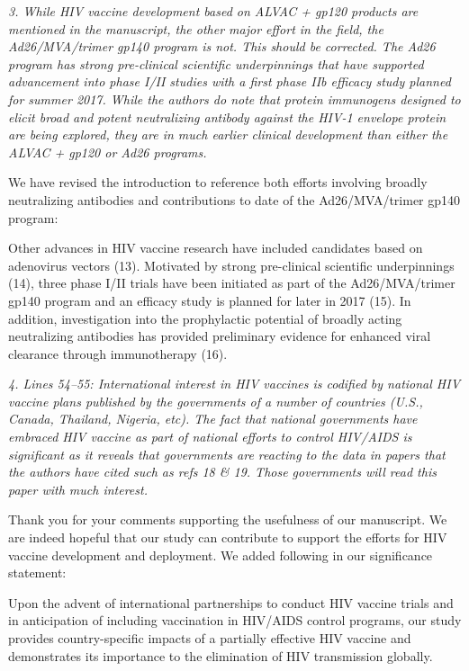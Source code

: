 \documentclass[12pt]{jpmletter}
\newenvironment{original}{\it}{}
\begin{document}
\begin{letter}{}
    \begin{original}
      3. While HIV vaccine development based on ALVAC + gp120 products
      are mentioned in the manuscript, the other major effort in the
      field, the Ad26/MVA/trimer gp140 program is not. This should be
      corrected. The Ad26 program has strong pre-clinical scientific
      underpinnings that have supported advancement into phase I/II
      studies with a first phase IIb efficacy study planned for summer
      2017. While the authors do note that protein immunogens designed
      to elicit broad and potent neutralizing antibody against the
      HIV-1 envelope protein are being explored, they are in much
      earlier clinical development than either the ALVAC + gp120 or
      Ad26 programs.
    \end{original}

    We have revised the introduction to reference both efforts
    involving broadly neutralizing antibodies and contributions to
    date of the Ad26/MVA/trimer gp140 program:
    \begin{quoting}
      Other advances in HIV vaccine research have included candidates
      based on adenovirus vectors (13). Motivated by strong
      pre-clinical scientific underpinnings (14), three phase I/II
      trials have been initiated as part of the Ad26/MVA/trimer gp140
      program and an efficacy study is planned for later in 2017
      (15). In addition, investigation into the prophylactic potential
      of broadly acting neutralizing antibodies has provided
      preliminary evidence for enhanced viral clearance through
      immunotherapy (16).
    \end{quoting}

    \begin{original}
      4. Lines 54–55: International interest in HIV vaccines is
      codified by national HIV vaccine plans published by the
      governments of a number of countries (U.S., Canada, Thailand,
      Nigeria, etc). The fact that national governments have embraced
      HIV vaccine as part of national efforts to control HIV/AIDS is
      significant as it reveals that governments are reacting to the
      data in papers that the authors have cited such as refs 18 \&
      19. Those governments will read this paper with much interest.
    \end{original}

    Thank you for your comments supporting the usefulness of our
    manuscript. We are indeed hopeful that our study can contribute to
    support the efforts for HIV vaccine development and deployment. We
    added following in our significance statement:
    \begin{quoting}
      Upon the advent of international partnerships to conduct HIV
      vaccine trials and in anticipation of including vaccination in
      HIV/AIDS control programs, our study provides country-specific
      impacts of a partially effective HIV vaccine and demonstrates
      its importance to the elimination of HIV transmission globally.
    \end{quoting}

  \end{letter}
\end{document}
